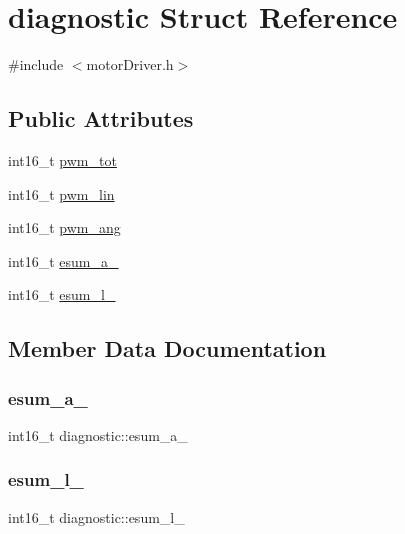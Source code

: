 \hypertarget{structdiagnostic}{}\section{diagnostic Struct Reference}
\label{structdiagnostic}


{\ttfamily \#include $<$motor\+Driver.\+h$>$}

\subsection*{Public Attributes}
\begin{DoxyCompactItemize}
\item 
int16\+\_\+t \mbox{\hyperlink{structdiagnostic_a5c8156e4aa730082e44fe16efff0d7bc}{pwm\+\_\+tot}}
\item 
int16\+\_\+t \mbox{\hyperlink{structdiagnostic_a65b4e8ea97a29c15f20a4b1c15f69917}{pwm\+\_\+lin}}
\item 
int16\+\_\+t \mbox{\hyperlink{structdiagnostic_a58a1c02e90d32275784de03f86efa0af}{pwm\+\_\+ang}}
\item 
int16\+\_\+t \mbox{\hyperlink{structdiagnostic_a4a52c0ef53b2627a0beda0dec86580e1}{esum\+\_\+a\+\_\+}}
\item 
int16\+\_\+t \mbox{\hyperlink{structdiagnostic_a68d01d2da2e9bd70123693918a0a65ed}{esum\+\_\+l\+\_\+}}
\end{DoxyCompactItemize}


\subsection{Member Data Documentation}
\mbox{\label{structdiagnostic_a4a52c0ef53b2627a0beda0dec86580e1}} 
\subsubsection{\texorpdfstring{esum\_a\_}{esum\_a\_}}
{\footnotesize\ttfamily int16\+\_\+t diagnostic\+::esum\+\_\+a\+\_\+}

\mbox{\label{structdiagnostic_a68d01d2da2e9bd70123693918a0a65ed}} 
\subsubsection{\texorpdfstring{esum\_l\_}{esum\_l\_}}
{\footnotesize\ttfamily int16\+\_\+t diagnostic\+::esum\+\_\+l\+\_\+}

